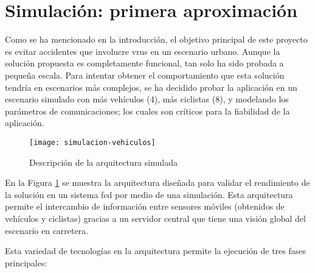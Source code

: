 \section{Simulación: primera aproximación}
Como se ha mencionado en la introducción, el objetivo principal de este
proyecto es evitar accidentes que involucre \gls{vru}s en un escenario urbano.
Aunque la solución propuesta es completamente funcional, tan solo ha sido
probada a pequeña escala. Para intentar obtener el comportamiento que esta
solución tendría en escenarios más complejos, se ha decidido probar la
aplicación en un escenario simulado con más vehículos (4), más ciclistas (8),
y modelando los parámetros de comunicaciones; los cuales son críticos para la
fiabilidad de la aplicación.

\begin{figure}[h]
	\texttt{[image: simulacion-vehiculos]}
	\caption{Descripción de la arquitectura simulada}
	\label{fig:simulacion-vehiculos}
\end{figure}

En la Figura \ref{fig:simulacion-vehiculos} se muestra la arquitectura diseñada
para validar el rendimiento de la solución en un sistema \gls{fcd} por medio de
una simulación. Esta arquitectura permite el intercambio de información entre
sensores móviles (obtenidos de vehículos y ciclistas) gracias a un servidor
central que tiene una visión global del escenario en carretera.

Esta variedad de tecnologías en la arquitectura permite la ejecución de tres
fases principales:

